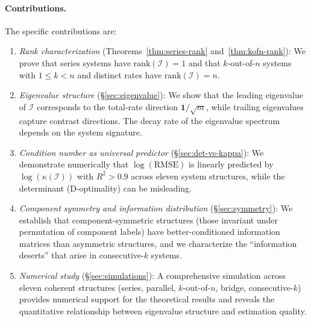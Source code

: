 \documentclass[12pt]{article}
\theoremstyle{definition}
\theoremstyle{remark}
\newcommand{\rank}{\mathrm{rank}}
\newcommand{\bone}{\mathbf{1}}
\begin{document}
\paragraph{Contributions.}
The specific contributions are:
\begin{enumerate}[leftmargin=2em]
  \item \emph{Rank characterization} (Theorems~\ref{thm:series-rank}
    and~\ref{thm:kofn-rank}):
    We prove that series systems have $\rank(\mathcal{I}) = 1$ and
    that $k$-out-of-$n$ systems with $1 \leq k < n$ and distinct
    rates have $\rank(\mathcal{I}) = n$.

  \item \emph{Eigenvalue structure} (\S\ref{sec:eigenvalue}):
    We show that the leading eigenvalue of $\mathcal{I}$ corresponds
    to the total-rate direction $\bone/\sqrt{m}$, while trailing
    eigenvalues capture contrast directions.  The decay rate of the
    eigenvalue spectrum depends on the system signature.

  \item \emph{Condition number as universal predictor}
    (\S\ref{sec:det-vs-kappa}):
    We demonstrate numerically that $\log(\text{RMSE})$ is linearly
    predicted by $\log(\kappa(\mathcal{I}))$ with $R^2 > 0.9$ across
    eleven system structures, while the determinant (D-optimality) can
    be misleading.

  \item \emph{Component symmetry and information distribution}
    (\S\ref{sec:symmetry}):
    We establish that component-symmetric structures (those invariant
    under permutation of component labels) have better-conditioned
    information matrices than asymmetric structures, and we
    characterize the ``information deserts'' that arise in
    consecutive-$k$ systems.

  \item \emph{Numerical study} (\S\ref{sec:simulations}):
    A comprehensive simulation across eleven coherent structures
    (series, parallel, $k$-out-of-$n$, bridge, consecutive-$k$)
    provides numerical support for the theoretical results and reveals
    the quantitative relationship between eigenvalue structure and
    estimation quality.
\end{enumerate}
\end{document}
